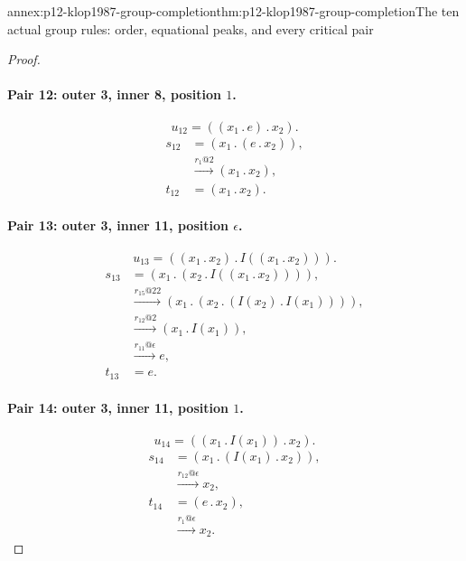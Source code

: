 \begin{annexitem}{annex:p12-klop1987-group-completion}{thm:p12-klop1987-group-completion}{The ten actual group rules: order, equational peaks, and every critical pair}
\begin{proof}
\paragraph{Pair 12: outer 3, inner 8, position \(1\).}
\[
 u_{12}=((x_{1}\mathbin{.}e)\mathbin{.}x_{2}).
\]
\begin{align*}
 s_{12}&=(x_{1}\mathbin{.}(e\mathbin{.}x_{2})),\\
 &\xrightarrow{r_{1}@2}(x_{1}\mathbin{.}x_{2}),\\
 t_{12}&=(x_{1}\mathbin{.}x_{2}).
\end{align*}

\paragraph{Pair 13: outer 3, inner 11, position \(\epsilon\).}
\[
 u_{13}=((x_{1}\mathbin{.}x_{2})\mathbin{.}I((x_{1}\mathbin{.}x_{2}))).
\]
\begin{align*}
 s_{13}&=(x_{1}\mathbin{.}(x_{2}\mathbin{.}I((x_{1}\mathbin{.}x_{2})))),\\
 &\xrightarrow{r_{15}@22}(x_{1}\mathbin{.}(x_{2}\mathbin{.}(I(x_{2})\mathbin{.}I(x_{1})))),\\
 &\xrightarrow{r_{12}@2}(x_{1}\mathbin{.}I(x_{1})),\\
 &\xrightarrow{r_{11}@\epsilon}e,\\
 t_{13}&=e.
\end{align*}

\paragraph{Pair 14: outer 3, inner 11, position \(1\).}
\[
 u_{14}=((x_{1}\mathbin{.}I(x_{1}))\mathbin{.}x_{2}).
\]
\begin{align*}
 s_{14}&=(x_{1}\mathbin{.}(I(x_{1})\mathbin{.}x_{2})),\\
 &\xrightarrow{r_{12}@\epsilon}x_{2},\\
 t_{14}&=(e\mathbin{.}x_{2}),\\
 &\xrightarrow{r_{1}@\epsilon}x_{2}.
\end{align*}


\end{proof}
\end{annexitem}
